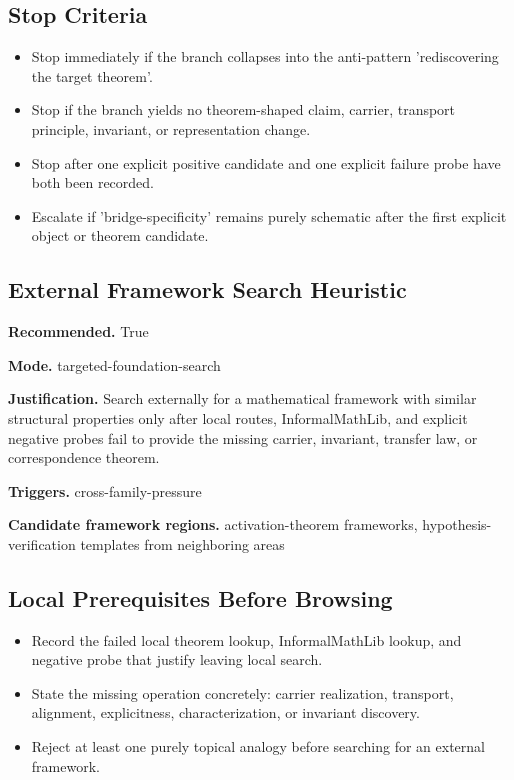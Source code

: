 \documentclass[11pt]{article}
\begin{document}
\subsection*{Stop Criteria}
\begin{itemize}[leftmargin=*,itemsep=0.2em]
\item Stop immediately if the branch collapses into the anti-pattern 'rediscovering the target theorem'.
\item Stop if the branch yields no theorem-shaped claim, carrier, transport principle, invariant, or representation change.
\item Stop after one explicit positive candidate and one explicit failure probe have both been recorded.
\item Escalate if 'bridge-specificity' remains purely schematic after the first explicit object or theorem candidate.
\end{itemize}
\subsection*{External Framework Search Heuristic}
\textbf{Recommended.} True

\textbf{Mode.} targeted-foundation-search

\textbf{Justification.} Search externally for a mathematical framework with similar structural properties only after local routes, InformalMathLib, and explicit negative probes fail to provide the missing carrier, invariant, transfer law, or correspondence theorem.

\textbf{Triggers.} cross-family-pressure

\textbf{Candidate framework regions.} activation-theorem frameworks, hypothesis-verification templates from neighboring areas

\subsection*{Local Prerequisites Before Browsing}
\begin{itemize}[leftmargin=*,itemsep=0.2em]
\item Record the failed local theorem lookup, InformalMathLib lookup, and negative probe that justify leaving local search.
\item State the missing operation concretely: carrier realization, transport, alignment, explicitness, characterization, or invariant discovery.
\item Reject at least one purely topical analogy before searching for an external framework.
\end{itemize}
\end{document}
